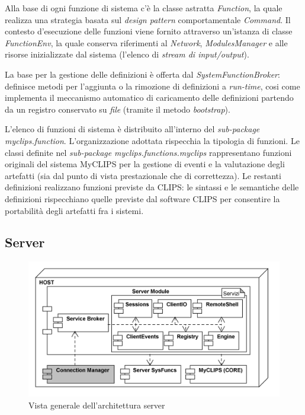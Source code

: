 Alla base di ogni funzione di sistema c'è la classe astratta \emph{Function}, la quale realizza una strategia basata sul \emph{design pattern} comportamentale \emph{Command}. Il contesto d'esecuzione delle funzioni viene fornito attraverso un'istanza di classe \emph{FunctionEnv}, la quale conserva riferimenti al \emph{Network}, \emph{ModulesManager} e alle risorse inizializzate dal sistema (l'elenco di \emph{stream di input/output}).

La base per la gestione delle definizioni è offerta dal \emph{SystemFunctionBroker}: definisce metodi per l'aggiunta o la rimozione di definizioni a \emph{run-time}, cosi come implementa il meccanismo automatico di caricamento delle definizioni partendo da un registro conservato su \emph{file} (tramite il metodo \emph{bootstrap}).

L'elenco di funzioni di sistema è distribuito all'interno del \emph{sub-package} \emph{myclips.function}. L'organizzazione adottata rispecchia la tipologia di funzioni. Le classi definite nel \emph{sub-package} \emph{myclips.functions.myclips} rappresentano funzioni originali del sistema MyCLIPS per la gestione di eventi e la valutazione degli artefatti (sia dal punto di vista prestazionale che di correttezza). Le restanti definizioni realizzano funzioni previste da CLIPS: le sintassi e le semantiche delle definizioni rispecchiano quelle previste dal software CLIPS per consentire la portabilità degli artefatti fra i sistemi.

\subsection{Server}

\begin{figure}[h]
\centering
\includegraphics[width=1\textwidth]{Immagini/Capitolo3/Deployment/Server.png}
\caption{Vista generale dell'architettura server}\label{fig:architettura-server}
\end{figure}

